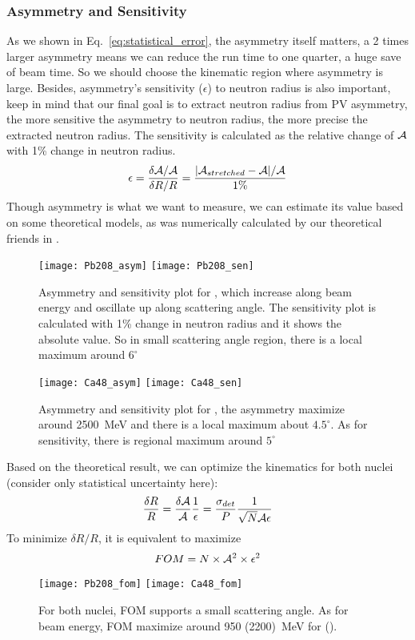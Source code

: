 \subsubsection{Asymmetry and Sensitivity}
As we shown in Eq.~\ref{eq:statistical_error}, the asymmetry itself matters,
a 2 times larger asymmetry means we can reduce the run time to one quarter,
a huge save of beam time. So we should choose the kinematic region where
asymmetry is large. Besides, asymmetry's sensitivity ($\epsilon$) to neutron radius is
also important, keep in mind that our final goal is to extract neutron radius
from PV asymmetry, the more sensitive the asymmetry to neutron radius, the
more precise the extracted neutron radius. The sensitivity is calculated
as the relative change of $\mathcal{A}$ with 1\% change in neutron radius.
\begin{equation}
    \epsilon = \frac{\delta \mathcal{A}/\mathcal{A}}{\delta R/R} = \frac{|\mathcal{A}_{stretched} - \mathcal{A}|/\mathcal{A}}{1\%}
\end{equation}
Though asymmetry is what we want to measure, we can estimate its value based
on some theoretical models, as was numerically calculated by our theoretical 
friends in \cite{PhysRevC.57.3430}.
\begin{figure}[h!]
    \texttt{[image: Pb208\_asym]}
    \texttt{[image: Pb208\_sen]}
    \caption{Asymmetry and sensitivity plot for \Pb, which increase along beam 
    energy and oscillate up along scattering angle. The sensitivity plot is
    calculated with 1\% change in neutron radius and it shows the absolute value.
    So in small scattering angle region, there is a local maximum around $6^\circ$}
\end{figure}
\begin{figure}[h!]
    \texttt{[image: Ca48\_asym]}
    \texttt{[image: Ca48\_sen]}
    \caption{Asymmetry and sensitivity plot for \Ca, the asymmetry maximize around
    2500~MeV and there is a local maximum about $4.5^\circ$. As for sensitivity,
    there is regional maximum around $5^\circ$}
    \label{fig:ca48_asym_sen}
\end{figure}

Based on the theoretical result, we can optimize the kinematics for both nuclei 
(consider only statistical uncertainty here):
\begin{equation}
    \frac{\delta R}{R} = \frac{\delta \mathcal{A}}{\mathcal{A}} \frac{1}{\epsilon} 
	= \frac{\sigma_{det}}{P} \frac{1}{\sqrt{N} \mathcal{A} \epsilon}
\end{equation}
To minimize $\delta R/R$, it is equivalent to maximize 
\begin{equation}
    FOM = N\times \mathcal{A}^2 \times \epsilon^2
\end{equation}
\begin{figure}
    \texttt{[image: Pb208\_fom]}
    \texttt{[image: Ca48\_fom]}
    \caption{For both nuclei, FOM supports a small scattering angle. As for beam energy,
    FOM maximize around 950 (2200)~MeV for \Pb (\Ca).}
\end{figure}

